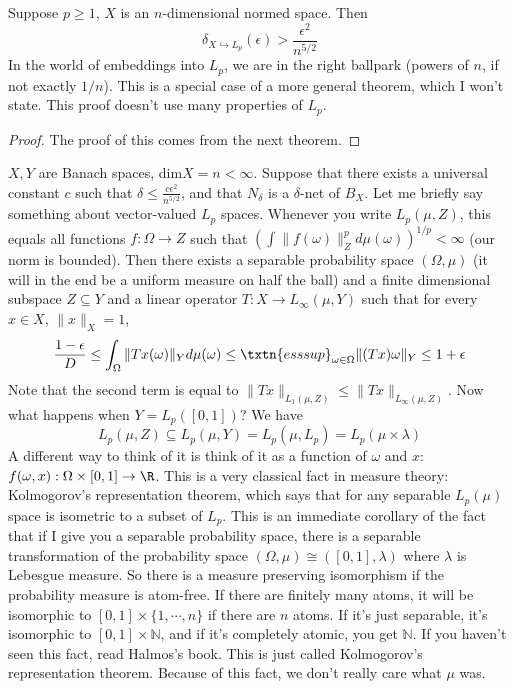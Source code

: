 \begin{thm} 
Suppose $p \geq 1$, $X$ is an $n$-dimensional normed space. Then 
\[
\delta_{X \hookrightarrow L_p}(\epsilon) > \frac{\epsilon^2}{n^{5/2}}
\]
In the world of embeddings into $L_p$, we are in the right ballpark (powers of $n$, if not exactly $1/n$). This is a special case of a more general theorem, which I won't state. This proof doesn't use many properties of $L_p$. 
\end{thm}
\begin{proof}
The proof of this comes from the next theorem. 
\end{proof}

\begin{thm} $X, Y$ are Banach spaces, dim$ X = n < \infty$. Suppose that there exists a universal constant $c$ such that $\delta \leq \frac{c\epsilon^2}{n^{5/2}}$, and that $N_{\delta}$ is a $\delta$-net of $B_X$. Let me briefly say something about vector-valued $L_p$ spaces. Whenever you write $L_p(\mu, Z)$, this equals all functions $f: \Omega \to Z$ such that $\left(\int \|f(\omega)\|_Z^p d\mu(\omega)\right)^{1/p} < \infty$ (our norm is bounded). Then there exists a separable probability space $(\Omega, \mu)$ (it will in the end be a uniform measure on half the ball) and a finite dimensional subspace $Z \subseteq Y$ and a linear operator $T: X \to L_{\infty}(\mu, Y)$ such that for every $x \in X$, $\|x\|_X = 1$, 
\[
\frac{1 - \epsilon}{D} \leq \int_{\Omega} \|Tx(\omega)\|_Y d\mu(\omega) \leq \txtn{esssup}_{\omega \in \Omega} \|(Tx)\omega\|_Y \leq 1 + \epsilon
\]
Note that the second term is equal to $\|Tx\|_{L_1(\mu, Z)} \leq \|Tx\|_{L_{\infty}(\mu, Z)}$. Now what happens when $Y = L_p([0, 1])$? We have
\[
L_p(\mu, Z) \subseteq L_p(\mu, Y) = L_p(\mu, L_p) = L_p(\mu \times \lambda)
\]
A different way to think of it is think of it as a function of $\omega$ and $x$: $f(\omega, x): \Omega \times [0, 1] \to \R$. This is a very classical fact in measure theory: Kolmogorov's representation theorem, which says that for any separable $L_p(\mu)$ space is isometric to a subset of $L_p$. This is an immediate corollary of the fact that if I give you a separable probability space, there is a separable transformation of the probability space $(\Omega, \mu) \cong ([0, 1], \lambda)$ where $\lambda$ is Lebesgue measure. So there is a measure preserving isomorphism if the probability measure is atom-free. If there are finitely many atoms, it will be isomorphic to $[0, 1] \times \{1, \cdots, n\}$ if there are $n$ atoms. If it's just separable, it's isomorphic to $[0, 1] \times \mathbb{N}$, and if it's completely atomic, you get $\mathbb{N}$. If you haven't seen this fact, read Halmos's book. This is just called Kolmogorov's representation theorem. 
Because of this fact, we don't really care what $\mu$ was. 


\end{thm}
